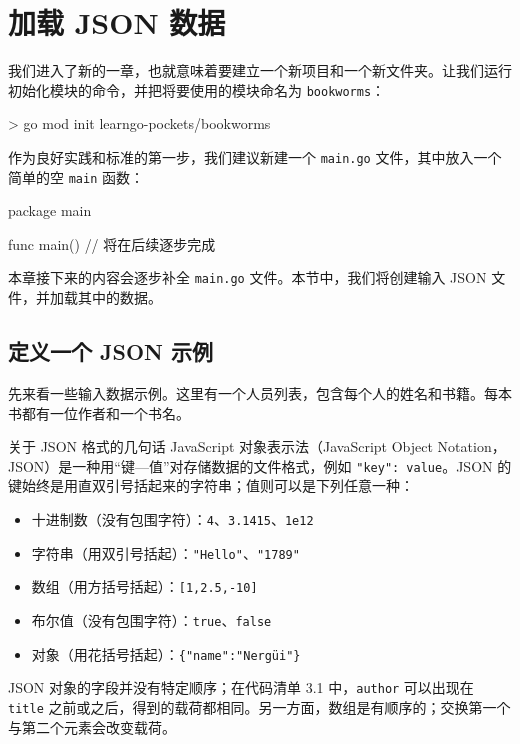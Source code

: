 \section{加载 JSON 数据}

我们进入了新的一章，也就意味着要建立一个新项目和一个新文件夹。让我们运行初始化模块的命令，并把将要使用的模块命名为 \texttt{bookworms}：

\begin{shellcode}[]
> go mod init learngo-pockets/bookworms
\end{shellcode}

作为良好实践和标准的第一步，我们建议新建一个 \texttt{main.go} 文件，其中放入一个简单的空 \texttt{main} 函数：

\begin{gocode}[]
package main

func main() {
    // 将在后续逐步完成
}
\end{gocode}

本章接下来的内容会逐步补全 \texttt{main.go} 文件。本节中，我们将创建输入 JSON 文件，并加载其中的数据。

\subsection{定义一个 JSON 示例}

先来看一些输入数据示例。这里有一个人员列表，包含每个人的姓名和书籍。每本书都有一位作者和一个书名。

\begin{infobox}{关于 JSON 格式的几句话}
JavaScript 对象表示法（JavaScript Object Notation，JSON）是一种用“键—值”对存储数据的文件格式，例如 \texttt{"key": value}。JSON 的键始终是用直双引号括起来的字符串；值则可以是下列任意一种：

\begin{itemize}
  \item 十进制数（没有包围字符）：\texttt{4}、\texttt{3.1415}、\texttt{1e12}
  \item 字符串（用双引号括起）：\texttt{"Hello"}、\texttt{"1789"}
  \item 数组（用方括号括起）：\texttt{[1,2.5,-10]}
  \item 布尔值（没有包围字符）：\texttt{true}、\texttt{false}
  \item 对象（用花括号括起）：\texttt{\{"name":"Nergüi"\}}
\end{itemize}

JSON 对象的字段并没有特定顺序；在代码清单 3.1 中，\texttt{author} 可以出现在 \texttt{title} 之前或之后，得到的载荷都相同。另一方面，数组是有顺序的；交换第一个与第二个元素会改变载荷。
\end{infobox}

